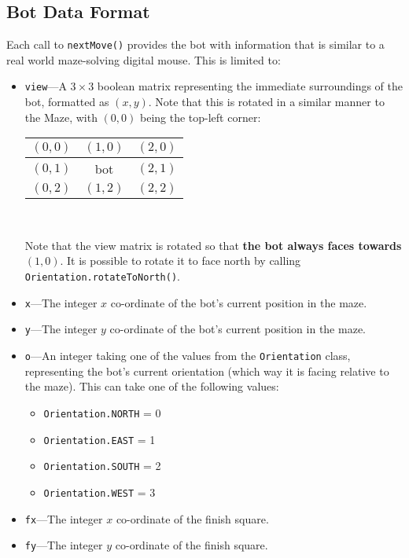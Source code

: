 \documentclass[11pt]{article}
\begin{document}
\subsection{Bot Data Format}
\label{section:dataformat}
Each call to \texttt{nextMove()} provides the bot with information that is similar to a real world maze-solving digital mouse.  This is limited to:
\begin{itemize}
    \item \texttt{view}---A $3 \times 3$ boolean matrix representing the immediate surroundings of the bot, formatted as $(x,y)$.  Note that this is rotated in a similar manner to the Maze, with $(0,0)$ being the top-left corner:\\
        \begin{center}
        \begin{tabular}{|c|c|c|}
            \hline
            $(0,0)$ & $(1,0)$ & $(2,0)$ \\ \hline
            $(0,1)$ & bot     & $(2,1)$ \\ \hline
            $(0,2)$ & $(1,2)$ & $(2,2)$ \\ \hline
        \end{tabular}\\
        \end{center}
        \vspace{12pt}
        Note that the view matrix is rotated so that \textbf{the bot always faces towards $(1,0)$}.  It is possible to rotate it to face north by calling \texttt{Orientation.rotateToNorth()}.

\item \texttt{x}---The integer $x$ co-ordinate of the bot's current position in the maze.
\item \texttt{y}---The integer $y$ co-ordinate of the bot's current position in the maze.

\item \texttt{o}---An integer taking one of the values from the \texttt{Orientation} class, representing the bot's current orientation (which way it is facing relative to the maze).  This can take one of the following values:
    \begin{itemize}
    \item \texttt{Orientation.NORTH} = 0
    \item \texttt{Orientation.EAST} = 1 
    \item \texttt{Orientation.SOUTH} = 2
    \item \texttt{Orientation.WEST} = 3
    \end{itemize}

\item \texttt{fx}---The integer $x$ co-ordinate of the finish square.
\item \texttt{fy}---The integer $y$ co-ordinate of the finish square.
\end{itemize}
\end{document}
